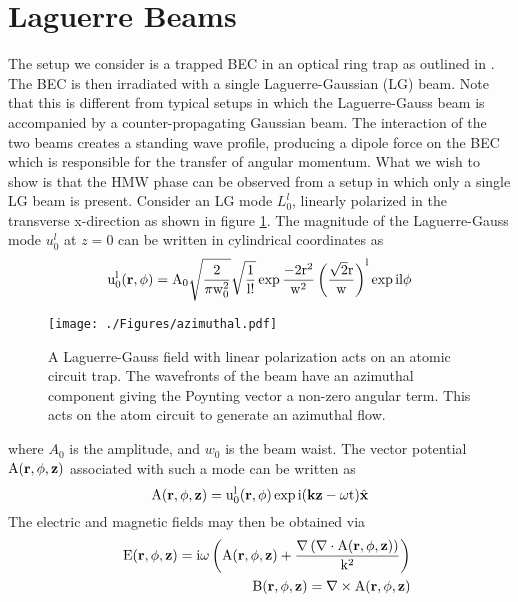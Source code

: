 \section{Laguerre Beams}
The setup we consider is a trapped BEC in an optical ring trap as outlined in \cite{phillips, boshier}.  The BEC is then irradiated with a single Laguerre-Gaussian (LG) beam. Note that this is different from typical setups \cite{campbell} in which the Laguerre-Gauss beam is accompanied by a counter-propagating Gaussian beam.  The interaction of the two beams creates a standing wave profile, producing a dipole force on the BEC which is responsible for the transfer of angular momentum. What we wish to show is that the HMW phase can be observed from a setup in which only a single LG beam is present. Consider an LG mode $L_0^l$, linearly polarized in the transverse x-direction as shown in figure \ref{fig:setup}.  The magnitude of the Laguerre-Gauss mode $u_0^l$ at $z=0$ can be written in cylindrical coordinates as \cite{Willke}
\begin{equation} 
\mathrm{u_0^l(\bold{r,\phi})=A_0 \sqrt{\frac{2}{\pi w_0^2}}\sqrt{\frac{1}{l!}}\exp{\frac{-2r^2}{w^2}}\left(\frac{\sqrt{2}r}{w}\right)^{l}\exp{il\phi}}
\label{LGmode}
\end{equation}
\begin{figure}[htp]
\texttt{[image: ./Figures/azimuthal.pdf]}
\caption{A Laguerre-Gauss field with linear polarization acts on an atomic circuit trap. The wavefronts of the beam have an azimuthal component giving the Poynting vector a non-zero angular term.  This acts on the atom circuit to generate an azimuthal flow.} 
\label{fig:setup}
\end{figure}
where $A_0$ is the amplitude, and $w_0$ is the beam waist. The vector potential $\mathrm{A(\bold{r,\phi,z})}$ associated with such a mode can be written as
\begin{equation} 
\mathrm{A(\bold{r,\phi,z})}=\mathrm{u_0^l(\bold{r,\phi})\exp{i(\bold{kz}-\omega t)}\hat{\bold{x}}}
\label{vpotential}
\end{equation}
The electric and magnetic fields may then be obtained via
\begin{eqnarray}
&&\mathrm{E(\bold{r,\phi,z})= i\omega \left(A(\bold{r,\phi,z})+\frac{\nabla\left(\nabla\cdot A(\bold{r,\phi,z})\right)}{k^2}\right)} \nonumber \\
&&\mathrm{B(\bold{r,\phi,z})=\nabla\times A(\bold{r,\phi,z})}
\end{eqnarray}
